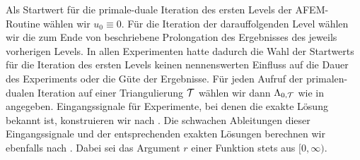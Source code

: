 Als Startwert für die primale-duale Iteration des ersten Levels der
AFEM-Routine wählen wir $u_0\equiv 0$. 
Für die Iteration der darauffolgenden Level wählen wir die zum Ende von
 beschriebene Prolongation des Ergebnisses des
jeweils vorherigen Levels.
In allen Experimenten hatte dadurch die Wahl der Startwerts für die Iteration
des ersten Levels keinen nennenswerten Einfluss auf die Dauer des Experiments
oder die Güte der Ergebnisse. 
Für jeden Aufruf der primalen-dualen Iteration auf einer Triangulierung $\mathcal{T}$
wählen wir dann $\Lambda_{0,\mathcal{T}}$ wie in
 angegeben.
Eingangssignale für Experimente, bei denen die exakte
Lösung bekannt ist, konstruieren wir nach .
Die schwachen Ableitungen dieser Eingangssignale und der entsprechenden exakten
Lösungen berechnen wir ebenfalls nach .
Dabei sei das Argument $r$ einer Funktion stets aus $[0,\infty)$.
